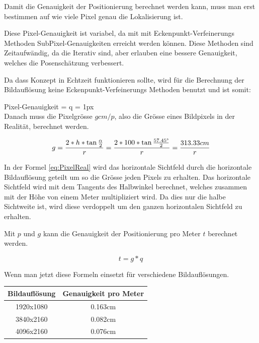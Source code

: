 Damit die Genauigkeit der Positionierung berechnet werden kann, muss man erst bestimmen auf wie viele Pixel genau die Lokalisierung ist.

Diese Pixel-Genauigkeit ist variabel, da mit mit Eckenpunkt-Verfeinerungs Methoden SubPixel-Genauigkeiten erreicht werden können.
Diese Methoden sind Zeitaufwändig, da die Iterativ sind, aber erlauben eine bessere Genauigkeit, welches die Posenschätzung verbessert.

Da dass Konzept in Echtzeit funktionieren sollte, wird für die Berechnung der Bildauflösung keine Eckenpunkt-Verfeinerungs Methoden benutzt und ist somit:

Pixel-Genauigkeit = q = 1px\\

Danach muss die Pixelgrösse \(g cm/p\), also die Grösse eines Bildpixels in der Realität, berechnet werden.

\begin{equation}
g = \frac{2*h*\tan\frac{\alpha}{2}}{r} = \frac{2*100*\tan\frac{57.45\degree}{2}}{r} = \frac{313.33cm}{r}
\label{eq:PixelReal}
\end{equation}

In der Formel \ref{eq:PixelReal} wird das horizontale Sichtfeld durch die horizontale Bildauflösung geteilt um so die Grösse jeden Pixels zu erhalten.
Das horizontale Sichtfeld wird mit dem Tangents des Halbwinkel berechnet, welches zusammen mit der Höhe von einem Meter multipliziert wird.
Da dies nur die halbe Sichtweite ist, wird diese verdoppelt um den ganzen horizontalen Sichtfeld zu erhalten.

Mit \(p\) und \(g\) kann die Genauigkeit der Positionierung pro Meter \(t\)  berechnet werden.

\begin{equation}
t = g * q
\label{eq:precision}
\end{equation}

Wenn man jetzt diese Formeln einsetzt für verschiedene Bildauflösungen.

\begin{center}
    \begin{tabular}{ c c}
    \label{tab:resolutions}
     Bildauflösung & Genauigkeit pro Meter\\ 
     \hline
     1920x1080 & 0.163cm \\  
     3840x2160 & 0.082cm \\
     4096x2160 & 0.076cm \\ 
\end{tabular}
\end{center}

